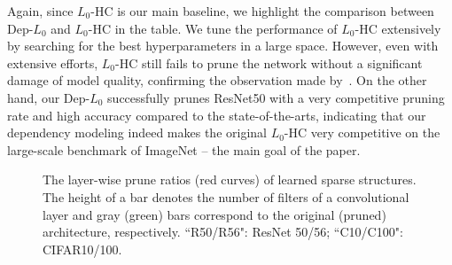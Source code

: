 \documentclass[runningheads, envcountsame, a4paper]{llncs}
\begin{document}
Again, since $L_0$-HC is our main baseline, we highlight the comparison between Dep-$L_0$ and $L_0$-HC in the table. We tune the performance of $L_0$-HC extensively by searching for the best hyperparameters in a large  space. However, even with extensive efforts, $L_0$-HC still fails to prune the network without a significant damage of model quality, confirming the observation made by~\cite{gale2019state}. On the other hand, our Dep-$L_0$ successfully prunes ResNet50 with a very competitive pruning rate and high accuracy compared to the state-of-the-arts, indicating that our dependency modeling indeed makes the original $L_0$-HC very competitive on the large-scale benchmark of ImageNet -- the main goal of the paper.


\begin{figure}[ht]
  \begin{center}
    \hfill
  \end{center}\vspace{-10pt}
  \caption{The layer-wise prune ratios (red curves) of learned sparse structures. The height of a bar denotes  the number of filters of a convolutional layer and gray (green) bars correspond to the original (pruned) architecture, respectively. ``R50/R56": ResNet 50/56; ``C10/C100": CIFAR10/100.}\label{fig: dist of sparsity}
\end{figure}
\end{document}
